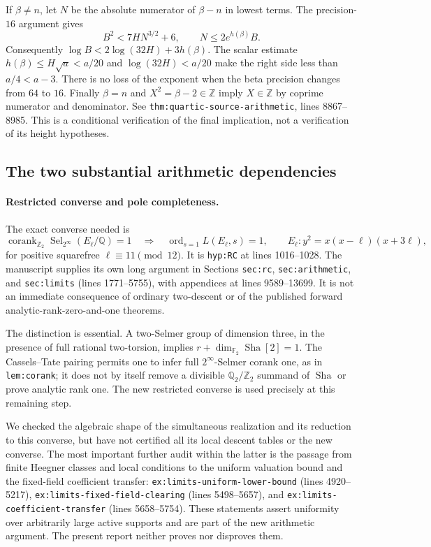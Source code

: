 \documentclass[11pt]{article}
\theoremstyle{definition}
\DeclareMathOperator{\Sha}{Sha}
\begin{document}
If $\beta\ne n$, let $N$ be the absolute numerator of
$\beta-n$ in lowest terms.  The precision-$16$ argument gives
\[
 B^2<7HN^{3/2}+6,\qquad N\le2e^{h(\beta)}B.
\]
Consequently
$\log B<2\log(32H)+3h(\beta)$.
The scalar estimate $h(\beta)\le H\sqrt a<a/20$ and
$\log(32H)<a/20$ make the right side less than $a/4<a-3$.
There is no loss of the exponent when the beta precision changes
from $64$ to $16$.  Finally $\beta=n$ and
$X^2=\beta-2\in\mathbb Z$ imply $X\in\mathbb Z$ by coprime
numerator and denominator.  See \nolinkurl{thm:quartic-source-arithmetic},
lines 8867--8985.  This is a conditional verification of the final
implication, not a verification of its height hypotheses.

\subsection{The two substantial arithmetic dependencies}

\paragraph{Restricted converse and pole completeness.}
The exact converse needed is
\[
 \operatorname{corank}_{\mathbb Z_2}
  \operatorname{Sel}_{2^\infty}(E_\ell/\mathbb Q)=1
 \quad\Longrightarrow\quad
 \operatorname{ord}_{s=1}L(E_\ell,s)=1,
 \qquad E_\ell:y^2=x(x-\ell)(x+3\ell),
\]
for positive squarefree $\ell\equiv11\pmod{12}$.
It is \texttt{hyp:RC} at lines 1016--1028.  The manuscript supplies
its own long argument in Sections \texttt{sec:rc},
\texttt{sec:arithmetic}, and \texttt{sec:limits} (lines 1771--5755),
with appendices at lines 9589--13699.  It is not an immediate
consequence of ordinary two-descent or of the published forward
analytic-rank-zero-and-one theorems.

The distinction is essential.  A two-Selmer group of dimension three,
in the presence of full rational two-torsion, implies
$r+\dim_{\mathbb F_2}\Sha[2]=1$.  The Cassels--Tate pairing permits
one to infer full $2^\infty$-Selmer corank one, as in
\texttt{lem:corank}; it does not by itself remove a divisible
$\mathbb Q_2/\mathbb Z_2$ summand of $\Sha$ or prove analytic rank one.
The new restricted converse is used precisely at this remaining step.

We checked the algebraic shape of the simultaneous realization and
its reduction to this converse, but have not certified all its local
descent tables or the new converse.  The most important further audit
within the latter is the passage from finite Heegner classes and local
conditions to the uniform valuation bound and the fixed-field
coefficient transfer:
\nolinkurl{ex:limits-uniform-lower-bound} (lines 4920--5217),
\nolinkurl{ex:limits-fixed-field-clearing} (lines 5498--5657), and
\nolinkurl{ex:limits-coefficient-transfer} (lines 5658--5754).
These statements assert uniformity over arbitrarily large active
supports and are part of the new arithmetic argument.  The present
report neither proves nor disproves them.
\end{document}
